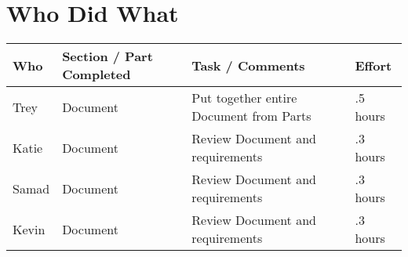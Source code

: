 \clearpage
\section{Who Did What}
\begin{table}[!h]
    \begin{tabular}{|p{2.5cm}|p{4.5cm}|p{4.5cm}|p{2.5cm}|}
   	\hline
	 Who   & Section / Part Completed & Task / Comments & Effort \\
	 \hline
	  Trey  & Document & Put together entire Document from Parts & .5 hours \\
   	 \hline
	 Katie & Document & Review Document and requirements & .3 hours \\
 	 \hline
	 Samad & Document & Review Document and requirements & .3 hours \\
 	 \hline
	 Kevin & Document & Review Document and requirements & .3 hours \\
 	 \hline
    \end{tabular}
\end{table}
